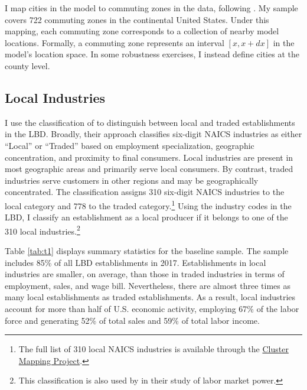 I map cities in the model to commuting zones in the data, following \textcite{Autor&Dorn13}. My sample covers 722 commuting zones in the continental United States. Under this mapping, each commuting zone corresponds to a collection of nearby model locations. Formally, a commuting zone represents an interval $[x,x+dx]$ in the model’s location space. In some robustness exercises, I instead define cities at the county level.

\subsection{Local Industries}
I use the classification of \textcite{DelgadoPorter&Stern16} to distinguish between local and traded establishments in the LBD. Broadly, their approach classifies six-digit NAICS industries as either ``Local'' or ``Traded'' based on employment specialization, geographic concentration, and proximity to final consumers. Local industries are present in most geographic areas and primarily serve local consumers. By contrast, traded industries serve customers in other regions and may be geographically concentrated. The classification assigns 310 six-digit NAICS industries to the local category and 778 to the traded category.\footnote{The full list of 310 local NAICS industries is available through the \href{https://clustermapping.us/}{Cluster Mapping Project}.} Using the industry codes in the LBD, I classify an establishment as a local producer if it belongs to one of the 310 local industries.\footnote{This classification is also used by \textcite{BergerHerkenhoff&Mongey22} in their study of labor market power.}

Table \ref{tab:t1} displays summary statistics for the baseline sample. The sample includes 85\% of all LBD establishments in 2017. Establishments in local industries are smaller, on average, than those in traded industries in terms of employment, sales, and wage bill. Nevertheless, there are almost three times as many local establishments as traded establishments. As a result, local industries account for more than half of U.S. economic activity, employing 67\% of the labor force and generating 52\% of total sales and 59\% of total labor income.


